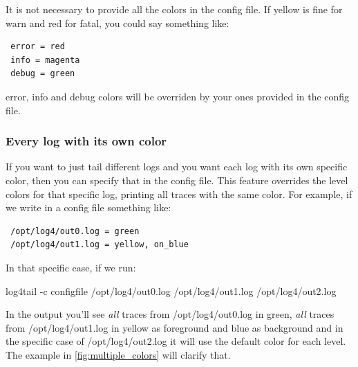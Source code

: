 It is not necessary to 
provide all the colors in the config file. If yellow is fine for warn and red for 
fatal, you could say something like:

\begin{config}
\begin{verbatim}
 error = red
 info = magenta
 debug = green
\end{verbatim}
\end{config}

\noindent
error, info and debug colors will be overriden by your ones provided in the config 
file. 

\subsubsection{Every log with its own color}
If you want to just tail different logs and you want each log with its own specific color, 
then you can specify that in the config file. This feature overrides the level colors for that 
specific log, printing all traces with the same color. 
For example, if we write in a config file something like:

\begin{config}
\begin{verbatim}
 /opt/log4/out0.log = green
 /opt/log4/out1.log = yellow, on_blue
\end{verbatim}
\end{config}

In that specific case, if we run:
\begin{cmd}
 log4tail -c configfile /opt/log4/out0.log /opt/log4/out1.log /opt/log4/out2.log
\end{cmd}
In the output you'll see \emph{all} traces from /opt/log4/out0.log in green, 
\emph{all} traces from /opt/log4/out1.log in yellow as foreground and blue as background 
and in the specific case of /opt/log4/out2.log it will use the default color for each level. 
The example in \autoref{fig:multiple_colors} will clarify that.

